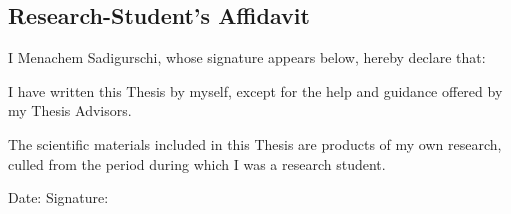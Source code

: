 \begin{titlepage}
    \chapter*{Research-Student's Affidavit}
    
    
    
    I Menachem Sadigurschi, whose signature appears below, hereby declare that:
    
    \vspace{1cm}
    
    I have written this Thesis by myself, except for the help and guidance offered by my Thesis Advisors.
    
    
    
    The scientific materials included in this Thesis are products of my own research, culled from the period during which I was a research student.
    
    \vfill
    
    
    \begin{flushleft}
            \vspace{-2cm}
            Date: \subdate  \hfill Signature:  
    \end{flushleft}
\end{titlepage}



